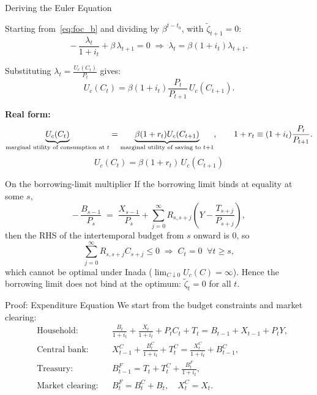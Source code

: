 \documentclass[11pt,aspectratio=169]{beamer}
\begin{document}
\begin{frame}{Deriving the Euler Equation}


Starting from~\eqref{eq:foc_b} and dividing by $\beta^{t-t_0}$, with $\tilde{\zeta}_{t+1}=0$:
\[
-\,\frac{\lambda_t}{1+i_t}+\beta\,\lambda_{t+1}=0
\;\Rightarrow\;
\lambda_t=\beta(1+i_t)\lambda_{t+1}.
\]

Substituting $\lambda_t=\tfrac{U_c(C_t)}{P_t}$ gives:
\[
U_c(C_t)
=\beta(1+i_t)\frac{P_t}{P_{t+1}}\,U_c(C_{t+1}).
\]

\textbf{Real form:}
\[
\underbrace{U_c(C_t)}_{\text{\scriptsize marginal utility of consumption at }t}
=
\underbrace{\beta(1+r_t)U_c(C_{t+1})}_{\text{\scriptsize marginal utility of saving to }t{+}1},
\qquad
1+r_t\equiv(1+i_t)\frac{P_t}{P_{t+1}}.
\]
\vspace{-0.2cm}
\[
U_c(C_t)=\beta(1+r_t)\,U_c(C_{t+1})
\]
\begin{center}
\hyperlink{euler}{}
\end{center}

\end{frame}
\begin{frame}{On the borrowing-limit multiplier}
If the borrowing limit binds at equality at some $s$,
\[
-\,\frac{B_{s-1}}{P_s} \;=\; \frac{X_{s-1}}{P_s} + \sum_{j=0}^{\infty} R_{s,s+j}\!\left( Y - \frac{T_{s+j}}{P_{s+j}} \right),
\]
then the RHS of the intertemporal budget from $s$ onward is $0$, so
\[
\sum_{j=0}^{\infty} R_{s,s+j} C_{s+j} \le 0 \;\Rightarrow\; C_{t}=0 \;\; \forall t\ge s,
\]
which cannot be optimal under Inada ($\lim_{C\downarrow 0}U_c(C)=\infty$).
Hence the borrowing limit does not bind at the optimum: $\tilde{\zeta}_t=0$ for all $t$.
\end{frame}

\begin{frame}[label=gdp_proof]{Proof: Expenditure Equation}
We start from the budget constraints and market clearing:
\begin{align}
&\text{Household:} && \frac{B_t}{1+i_t} + \frac{X_t}{1+i_t} + P_t C_t + T_t = B_{t-1} + X_{t-1} + P_t Y, \label{eq:exp_gdp1}\\
&\text{Central bank:} && X_{t-1}^{C} + \frac{B_{t}^{C}}{1+i_t} + T_{t}^{C} = \frac{X_{t}^{C}}{1+i_t} + B_{t-1}^{C}, \label{eq:exp_gdp2}\\
&\text{Treasury:} && B_{t-1}^{F} = T_t + T_t^C + \frac{B_t^F}{1+i_t}, \label{eq:exp_gdp2p5}\\
&\text{Market clearing:} && B_t^F = B_t^C + B_t,\quad X_t^C = X_t. \label{eq:exp_gdp3}
\end{align}
\end{frame}
\end{document}
